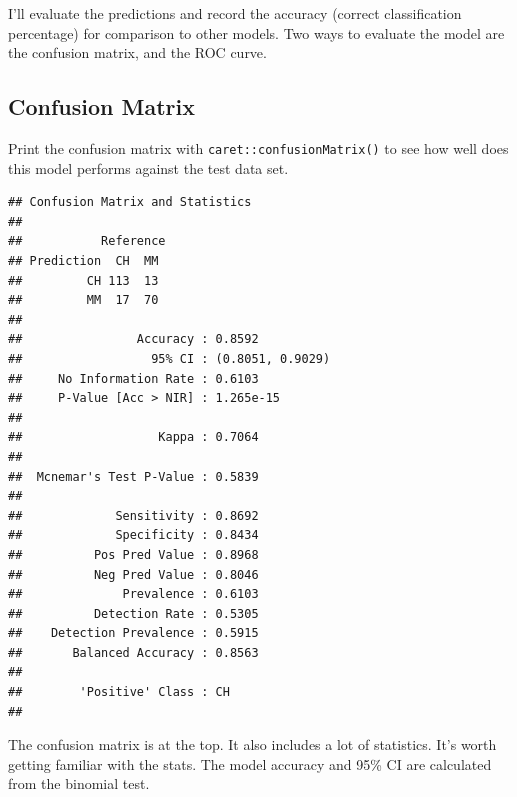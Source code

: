 \documentclass[
]{book}
\newenvironment{Shaded}{\begin{snugshade}}{\end{snugshade}}
\newcommand{\DataTypeTok}[1]{\textcolor[rgb]{0.13,0.29,0.53}{#1}}
\newcommand{\KeywordTok}[1]{\textcolor[rgb]{0.13,0.29,0.53}{\textbf{#1}}}
\newcommand{\NormalTok}[1]{#1}
\newcommand{\OperatorTok}[1]{\textcolor[rgb]{0.81,0.36,0.00}{\textbf{#1}}}
\newcommand{\StringTok}[1]{\textcolor[rgb]{0.31,0.60,0.02}{#1}}
\begin{document}
I'll evaluate the predictions and record the accuracy (correct classification percentage) for comparison to other models. Two ways to evaluate the model are the confusion matrix, and the ROC curve.

\hypertarget{confusion-matrix}{%
\subsection{Confusion Matrix}\label{confusion-matrix}}

Print the confusion matrix with \texttt{caret::confusionMatrix()} to see how well does this model performs against the test data set.

\begin{Shaded}
\end{Shaded}

\begin{verbatim}
## Confusion Matrix and Statistics
## 
##           Reference
## Prediction  CH  MM
##         CH 113  13
##         MM  17  70
##                                           
##                Accuracy : 0.8592          
##                  95% CI : (0.8051, 0.9029)
##     No Information Rate : 0.6103          
##     P-Value [Acc > NIR] : 1.265e-15       
##                                           
##                   Kappa : 0.7064          
##                                           
##  Mcnemar's Test P-Value : 0.5839          
##                                           
##             Sensitivity : 0.8692          
##             Specificity : 0.8434          
##          Pos Pred Value : 0.8968          
##          Neg Pred Value : 0.8046          
##              Prevalence : 0.6103          
##          Detection Rate : 0.5305          
##    Detection Prevalence : 0.5915          
##       Balanced Accuracy : 0.8563          
##                                           
##        'Positive' Class : CH              
## 
\end{verbatim}

The confusion matrix is at the top. It also includes a lot of statistics. It's worth getting familiar with the stats. The model accuracy and 95\% CI are calculated from the binomial test.
\end{document}
